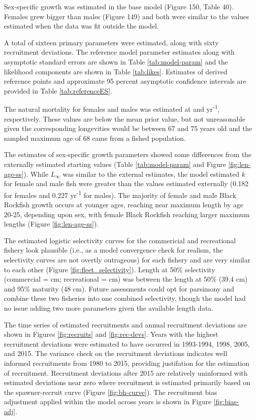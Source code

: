 \documentclass[11pt,
  english,
  letterpaper,
]{article}
\begin{document}
Sex-specific growth was estimated in the base model (Figure 150, Table 40). Females grew bigger than males (Figure 149) and both were similar to the values estimated when the data was fit outside the model.

A total of sixteen primary parameters were estimated, along with sixty recruitment deviations. The reference model parameter estimates along with asymptotic standard errors are shown in Table \ref{tab:model-param} and the likelihood components are shown in Table \ref{tab:likes}. Estimates of derived reference points and approximate 95 percent asymptotic confidence intervals are provided in Table \ref{tab:referenceES}.

The natural mortality for females and males was estimated at and yr\textsuperscript{-1}, respectively. These values are below the mean prior value, but not unreasonable given the corresponding longevities would be between 67 and 75 years old and the sampled maximum age of 68 came from a fished population.

The estimates of sex-specific growth parameters showed some differences from the externally estimated starting values (Table \ref{tab:model-param} and Figure \ref{fig:len-age-ss}). While \(L_{\infty}\) was similar to the external estimates, the model estimated \(k\) for female and male fish were greater than the values estimated externally (0.182 for females and 0.227 yr\textsuperscript{-1} for males). The majority of female and male Black Rockfish growth occurs at younger ages, reaching near maximum length by age 20-25, depending upon sex, with female Black Rockfish reaching larger maximum lengths (Figure \ref{fig:len-age-ss}).

The estimated logistic selectivity curves for the commericial and recreational fishery look plausible (i.e., as a model convergence check for realism, the selectivity curves are not overtly outrageous) for each fishery and are very similar to each other (Figure \ref{fig:fleet_selectivity}). Length at 50\% selectivity (commercial = cm; recreational = cm) was between the length at 50\% (39.4 cm) and 95\% maturity (48 cm). Future assessments could opt for parsimony and combine these two fisheries into one combined selectivity, though the model had no issue adding two more parameters given the available length data.

The time series of estimated recruitments and annual recruitment deviations are shown in Figures \ref{fig:recruits} and \ref{fig:rec-devs}. Years with the highest recruitment deviations were estimated to have occurred in 1993-1994, 1998, 2005, and 2015. The variance check on the recruitment deviations indicates well informed recruitments from 1980 to 2015, providing justifation for the estimation of recruitment. Recruitment deviations after 2015 are relatively uninformed with estimated deviations near zero where recruitment is estimated primarily based on the spawner-recruit curve (Figure \ref{fig:bh-curve}). The recruitment bias adjustment applied within the model across years is shown in Figure \ref{fig:bias-adj}.
\end{document}
